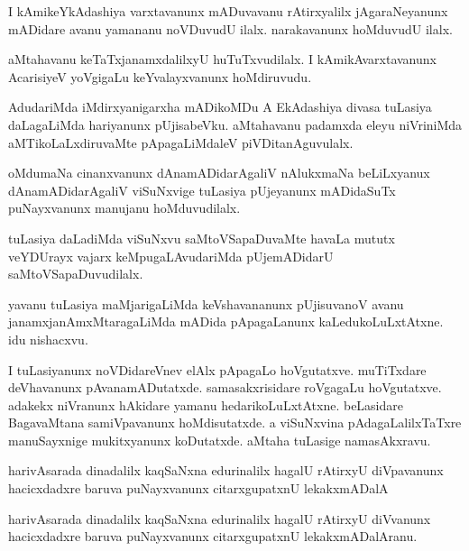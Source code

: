 \documentclass{article}
\begin{document}
\begin{mn}%
I kAmikeYkAdashiya varxtavanunx mADuvavanu rAtirxyalilx jAgaraNeyanunx mADidare avanu yamananu 
noVDuvudU ilalx. narakavanunx hoMduvudU ilalx.
\end{mn}

\begin{mn}%
aMtahavanu keTaTxjanamxdalilxyU huTuTxvudilalx. I kAmikAvarxtavanunx AcarisiyeV yoVgigaLu 
keYvalayxvanunx hoMdiruvudu.
\end{mn}

\begin{mn}%
AdudariMda iMdirxyanigarxha mADikoMDu A EkAdashiya divasa tuLasiya daLagaLiMda hariyanunx 
pUjisabeVku. aMtahavanu padamxda eleyu niVriniMda aMTikoLaLxdiruvaMte pApagaLiMdaleV 
piVDitanAguvulalx.
\end{mn}

\begin{mn}%
oMdumaNa cinanxvanunx dAnamADidarAgaliV nAlukxmaNa beLiLxyanux dAnamADidarAgaliV viSuNxvige 
tuLasiya pUjeyanunx mADidaSuTx puNayxvanunx manujanu hoMduvudilalx.
\end{mn}

\begin{mn}%
tuLasiya daLadiMda viSuNxvu saMtoVSapaDuvaMte havaLa mututx veYDUrayx vajarx keMpugaLAvudariMda 
pUjemADidarU saMtoVSapaDuvudilalx.
\end{mn}

\begin{mn}%
yavanu tuLasiya maMjarigaLiMda keVshavananunx pUjisuvanoV avanu janamxjanAmxMtaragaLiMda mADida 
pApagaLanunx kaLedukoLuLxtAtxne. idu nishacxvu.
\end{mn}

\begin{mn}%
I tuLasiyanunx noVDidareVnev elAlx pApagaLo hoVgutatxve. muTiTxdare deVhavanunx pAvanamADutatxde. 
samasakxrisidare roVgagaLu hoVgutatxve. adakekx niVranunx hAkidare yamanu hedarikoLuLxtAtxne. 
beLasidare BagavaMtana samiVpavanunx hoMdisutatxde. a viSuNxvina pAdagaLalilxTaTxre manuSayxnige 
mukitxyanunx koDutatxde. aMtaha tuLasige namasAkxravu.
\end{mn}

\begin{mn}%
harivAsarada dinadalilx kaqSaNxna edurinalilx hagalU rAtirxyU diVpavanunx hacicxdadxre baruva 
puNayxvanunx citarxgupatxnU lekakxmADalA
\end{mn}

\begin{mn}%
harivAsarada dinadalilx kaqSaNxna edurinalilx hagalU rAtirxyU diVvanunx hacicxdadxre baruva 
puNayxvanunx citarxgupatxnU lekakxmADalAranu.
\end{mn}
\end{document}
